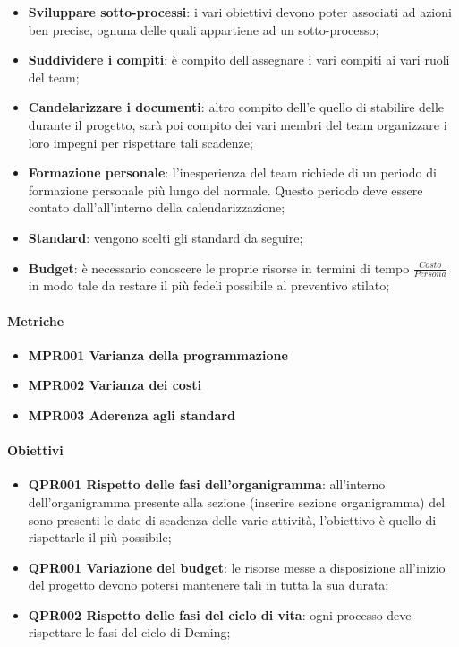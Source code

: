 		\begin{itemize}
			\item \textbf{Sviluppare sotto-processi}: i vari obiettivi devono poter associati ad azioni ben precise, ognuna delle quali appartiene ad un sotto-processo;
			\item \textbf{Suddividere i compiti}: è compito dell'\Amm assegnare i vari compiti ai vari ruoli del team;
			\item \textbf{Candelarizzare i documenti}: altro compito dell'\Amm e quello di stabilire delle  durante il progetto, sarà poi compito dei vari membri del team organizzare i loro impegni per rispettare tali scadenze;
			\item \textbf{Formazione personale}: l'inesperienza del team richiede di un periodo di formazione personale più lungo del normale. Questo periodo deve essere contato dall'\Amm all'interno della calendarizzazione;
			\item \textbf{Standard}: vengono scelti gli standard da seguire;
			\item \textbf{Budget}: è necessario conoscere le proprie risorse in termini di tempo $\frac{Costo}{Persona}$ in modo tale da restare il più fedeli possibile al preventivo stilato;
		\end{itemize}
	
		\paragraph*{Metriche}
		
		\begin{itemize}
			\item \textbf{MPR001 Varianza della programmazione}
			\item \textbf{MPR002 Varianza dei costi}
			\item \textbf{MPR003 Aderenza agli standard}
		\end{itemize}
	
		\paragraph{Obiettivi}
		
		\begin{itemize}
			\item \textbf{QPR001 Rispetto delle fasi dell'organigramma}: all'interno dell'organigramma presente alla sezione (inserire sezione organigramma) del \Doc{\PdP} sono presenti le date di scadenza delle varie attività, l'obiettivo è quello di rispettarle il più possibile;
			\item \textbf{QPR001 Variazione del budget}: le risorse messe a disposizione all'inizio del progetto devono potersi mantenere tali in tutta la sua durata;
			\item \textbf{QPR002 Rispetto delle fasi del ciclo di vita}: ogni processo deve rispettare le fasi del ciclo di Deming;
		\end{itemize}
	
